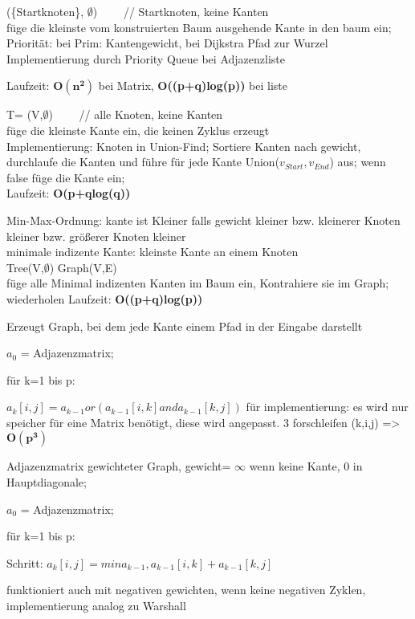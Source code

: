  (\{Startknoten\}, $\emptyset$) ~~~~// Startknoten, keine Kanten\\
 füge die kleinste vom konstruierten Baum ausgehende Kante in den baum ein;\\
Priorität: bei Prim: Kantengewicht, bei Dijkstra Pfad zur Wurzel\\
Implementierung durch Priority Queue bei Adjazenzliste

Laufzeit: $\mathbf{O(n^2)}$ bei Matrix, \textbf{O((p+q)log(p))} bei liste

 T= (V,$\emptyset$) ~~~~// alle Knoten, keine Kanten\\
 füge die kleinste Kante ein, die keinen Zyklus erzeugt\\
Implementierung: Knoten in Union-Find; Sortiere Kanten nach gewicht, durchlaufe die Kanten und führe für jede Kante Union($v_{Start},v_{End}$) aus; wenn false füge die Kante ein;\\
Laufzeit: \textbf{O(p+qlog(q))}

Min-Max-Ordnung: kante ist Kleiner falls gewicht kleiner bzw. kleinerer Knoten kleiner bzw. größerer Knoten kleiner\\
minimale indizente Kante: kleinste Kante an einem Knoten\\
 Tree(V,$\emptyset$) Graph(V,E)\\
 füge alle Minimal indizenten Kanten im Baum ein, Kontrahiere sie im Graph; wiederholen
Laufzeit: \textbf{O((p+q)log(p))}

Erzeugt Graph, bei dem jede Kante einem Pfad in der Eingabe darstellt


 $a_0$ = Adjazenzmatrix;

für k=1 bis p: 

 $a_k[i,j] = a_{k-1} or( a_{k-1}[i,k] and a_{k-1}[k,j] )$
für implementierung: es wird nur speicher für eine Matrix benötigt, diese wird angepasst. 3 forschleifen (k,i,j) => 
$\mathbf{O(p^3)}$

Adjazenzmatrix gewichteter Graph, gewicht= $\infty$ wenn keine Kante, 0 in Hauptdiagonale;

 $a_0$ = Adjazenzmatrix;

für k=1 bis p: 

 Schritt: $a_k[i,j] = min{a_{k-1} , a_{k-1}[i,k] + a_{k-1}[k,j] }$

funktioniert auch mit negativen gewichten, wenn keine negativen Zyklen, implementierung analog zu Warshall
